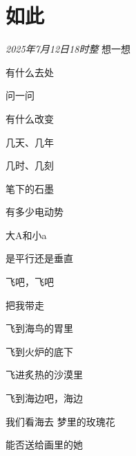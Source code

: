 \section*{如此}
\begin{center}
\textit{2025年7月12日18时整}\hh 
想一想

有什么去处

问一问

有什么改变

几天、几年

几时、几刻

笔下的石墨

有多少电动势

大A和小a

是平行还是垂直\hh

飞吧，飞吧

把我带走

飞到海鸟的胃里

飞到火炉的底下

飞进炙热的沙漠里

飞到海边吧，海边

我们看海去\hh
梦里的玫瑰花

能否送给画里的她
\end{center}